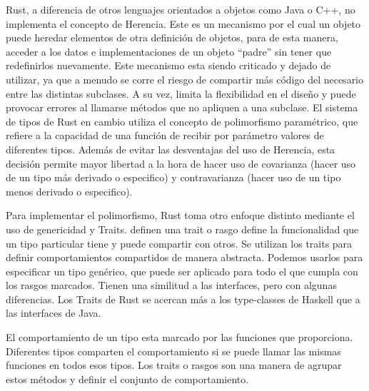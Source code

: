 Rust, a diferencia de otros lenguajes orientados a objetos como Java o C++, no implementa el concepto de Herencia. Este es un mecanismo por el cual un objeto puede heredar elementos de otra definición de objetos, para de esta manera, acceder a los datos e implementaciones de un objeto ``padre'' sin tener que redefinirlos nuevamente.
Este mecanismo esta siendo criticado y dejado de utilizar, ya que a menudo se corre el riesgo de compartir más código del necesario entre las distintas subclases. A su vez, limita la flexibilidad en el diseño y puede provocar errores al llamarse métodos que no apliquen a una subclase.
El sistema de tipos de Rust en cambio utiliza el concepto de polimorfismo paramétrico, que refiere a la capacidad de una función de recibir por parámetro valores de diferentes tipos. Además de evitar las desventajas del uso de Herencia, esta decisión permite mayor libertad a la hora de hacer uso de covarianza (hacer uso de un tipo más derivado o especifico) y contravarianza (hacer uso de un tipo menos derivado o especifico).

Para implementar el polimorfismo, Rust toma otro enfoque distinto mediante el uso de genericidad y Traits. \cite{rustbook} definen una trait o rasgo define la funcionalidad que un tipo particular tiene y puede compartir con otros. Se utilizan los traits para definir comportamientos compartidos de manera abstracta. Podemos usarlos para especificar un tipo genérico, que puede ser aplicado para todo el que cumpla con los rasgos marcados. Tienen una similitud a las interfaces, pero con algunas diferencias. Los Traits de Rust se acercan más a los type-classes de Haskell que a las interfaces de Java.

El comportamiento de un tipo esta marcado por las funciones que proporciona. Diferentes tipos comparten el comportamiento si se puede llamar las mismas funciones en todos esos tipos. Los traits o rasgos son una manera de agrupar estos métodos y definir el conjunto de comportamiento. 

